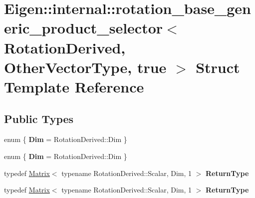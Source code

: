 \hypertarget{struct_eigen_1_1internal_1_1rotation__base__generic__product__selector_3_01_rotation_derived_00_945228ddac360fee065f79280b8a793b}{}\section{Eigen\+:\+:internal\+:\+:rotation\+\_\+base\+\_\+generic\+\_\+product\+\_\+selector$<$ Rotation\+Derived, Other\+Vector\+Type, true $>$ Struct Template Reference}
\label{struct_eigen_1_1internal_1_1rotation__base__generic__product__selector_3_01_rotation_derived_00_945228ddac360fee065f79280b8a793b}
\subsection*{Public Types}
\begin{DoxyCompactItemize}
\item 
\mbox{\label{struct_eigen_1_1internal_1_1rotation__base__generic__product__selector_3_01_rotation_derived_00_945228ddac360fee065f79280b8a793b_ab0d080d9544b03d71f542918d17aaf63}} 
enum \{ {\bfseries Dim} = Rotation\+Derived\+:\+:Dim
 \}
\item 
\mbox{\label{struct_eigen_1_1internal_1_1rotation__base__generic__product__selector_3_01_rotation_derived_00_945228ddac360fee065f79280b8a793b_a6e1b9bc7a1b76ee832956b4b7b5e9525}} 
enum \{ {\bfseries Dim} = Rotation\+Derived\+:\+:Dim
 \}
\item 
\mbox{\label{struct_eigen_1_1internal_1_1rotation__base__generic__product__selector_3_01_rotation_derived_00_945228ddac360fee065f79280b8a793b_a523751106cdef07ae1ea8cd07ab84d2a}} 
typedef \hyperlink{group___core___module_class_eigen_1_1_matrix}{Matrix}$<$ typename Rotation\+Derived\+::\+Scalar, Dim, 1 $>$ {\bfseries Return\+Type}
\item 
\mbox{\label{struct_eigen_1_1internal_1_1rotation__base__generic__product__selector_3_01_rotation_derived_00_945228ddac360fee065f79280b8a793b_a523751106cdef07ae1ea8cd07ab84d2a}} 
typedef \hyperlink{group___core___module_class_eigen_1_1_matrix}{Matrix}$<$ typename Rotation\+Derived\+::\+Scalar, Dim, 1 $>$ {\bfseries Return\+Type}
\end{DoxyCompactItemize}
